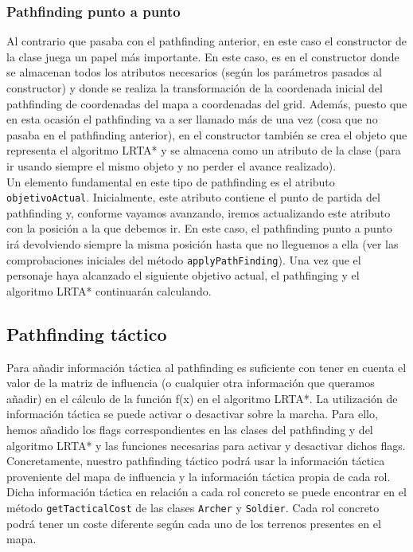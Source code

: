 \subsubsection{Pathfinding punto a punto}

Al contrario que pasaba con el pathfinding anterior, en este caso el constructor de la clase juega un papel más importante. En este caso, es en el constructor donde se almacenan todos los atributos necesarios (según los parámetros pasados al constructor) y donde se realiza la transformación de la coordenada inicial del pathfinding de coordenadas del mapa a coordenadas del grid. Además, puesto que en esta ocasión el pathfinding va a ser llamado más de una vez (cosa que no pasaba en el pathfinding anterior), en el constructor también se crea el objeto que representa el algoritmo LRTA* y se almacena como un atributo de la clase (para ir usando siempre el mismo objeto y no perder el avance realizado). \\

Un elemento fundamental en este tipo de pathfinding es el atributo \texttt{objetivoActual}. Inicialmente, este atributo contiene el punto de partida del pathfinding y, conforme vayamos avanzando, iremos actualizando este atributo con la posición a la que debemos ir. En este caso, el pathfinding punto a punto irá devolviendo siempre la misma posición hasta que no lleguemos a ella (ver las comprobaciones iniciales del método \texttt{applyPathFinding}). Una vez que el personaje haya alcanzado el siguiente objetivo actual, el pathfinging y el algoritmo LRTA* continuarán calculando.

\subsection{Pathfinding táctico}

Para añadir información táctica al pathfinding es suficiente con tener en cuenta el valor de la matriz de influencia (o cualquier otra información que queramos añadir) en el cálculo de la función f(x) en el algoritmo LRTA*. La utilización de información táctica se puede activar o desactivar sobre la marcha. Para ello, hemos añadido los flags correspondientes en las clases del pathfinding y del algoritmo LRTA* y las funciones necesarias para activar y desactivar dichos flags. \\

Concretamente, nuestro pathfinding táctico podrá usar la información táctica proveniente del mapa de influencia y la información táctica propia de cada rol. Dicha información táctica en relación a cada rol concreto se puede encontrar en el método \texttt{getTacticalCost} de las clases \texttt{Archer} y \texttt{Soldier}. Cada rol concreto podrá tener un coste diferente según cada uno de los terrenos presentes en el mapa.
